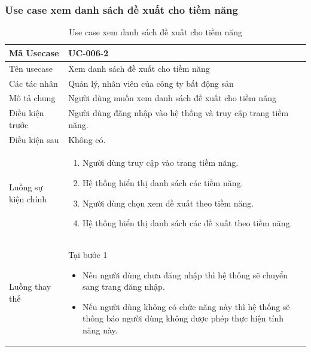 \documentclass[12pt,a4paper]{article}
\begin{document}
    \subsubsection*{Use case xem danh sách đề xuất cho tiềm năng}
    \begin{table}[H]
        \centering
        \begin{tabular}{|p{3.5cm}|p{11.5cm}|c|}
            \hline
            Mã Usecase      & UC-006-2                                                       \\
            \hline
            Tên usecase     & Xem danh sách đề xuất cho tiềm năng                            \\
            \hline
            Các tác nhân    & Quản lý, nhân viên của công ty bất động sản                    \\
            \hline
            Mô tả chung     & Người dùng muốn xem danh sách đề xuất cho tiềm năng            \\
            \hline

            Điều kiện trước & Người dùng đăng nhập vào hệ thống và truy cập trang tiềm năng. \\
            \hline

            Điều kiện sau   & Không có.                                                      \\
            \hline

            Luồng sự kiện chính & \vspace{-.8cm}\begin{enumerate}
                                                    \item Người dùng truy cập vào trang tiềm năng.
                                                    \item Hệ thống hiển thị danh sách các tiềm năng.
                                                    \item Người dùng chọn xem đề xuất theo tiềm năng.
                                                    \item Hệ thống hiển thị danh sách các đề xuất theo tiềm năng.
            \end{enumerate}
            \\
            \hline
            Luồng thay thế & Tại bước 1\newline
            \vspace{-.8cm}\begin{itemize}
                              \item Nếu người dùng chưa đăng nhập thì hệ thống sẽ chuyển sang trang đăng nhập.
                              \item Nếu người dùng không có chức năng này thì hệ thống sẽ thông báo người dùng không được phép thực hiện tính năng này.
            \end{itemize}
            \\ \hline
        \end{tabular}
        \caption{Use case xem danh sách đề xuất cho tiềm năng}
    \end{table}
\end{document}
